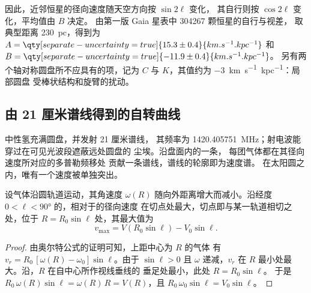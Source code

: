 因此，近邻恒星的径向速度随天空方向按 $\sin 2\ell$ 变化，
其自行则按 $\cos 2\ell$ 变化，平均值由 $B$ 决定。
由第一版 Gaia 星表中 \num{304267} 颗恒星的自行与视差，
取典型距离 \qty{230}{pc}，得到为
$A = \qty[separate-uncertainty=true]{15.3 \pm 0.4}{km.s^{-1}.kpc^{-1}}$
和 $B = \qty[separate-uncertainty=true]{-11.9 \pm 0.4}{km.s^{-1}.kpc^{-1}}$。
另有两个轴对称圆盘所不应具有的项，记为 $C$
与 $K$，其值约为 \qty{-3}{km.s^{-1}.kpc^{-1}}：局部圆盘
受棒状结构和旋臂的扰动。

\subsection*{由 21 厘米谱线得到的自转曲线}

中性氢充满圆盘，并发射 21 厘米谱线，
其频率为 \qty{1420.405751}{MHz}；射电波能穿过在可见光波段遮蔽远处圆盘的
尘埃。沿盘面内的一条，
每团气体都在其径向速度所对应的多普勒频移处
贡献一条谱线，谱线的轮廓即为速度谱。
在太阳圆之内，唯有一个速度被单独突出。

\begin{theorem}[切点法]\label{thm:b3:milky-way-galaxies:tangent}
设气体沿圆轨道运动，其角速度 $\omega(R)$
随向外距离增大而减小。沿经度
$0 < \ell < \ang{90}$ 的，相对于的径向速度
在切点处最大，切点即与某一轨道相切之处，位于
$R = R_0\sin\ell$ 处，其最大值为
\[
v_\mathrm{max} = V(R_0\sin\ell) - V_0\sin\ell .
\]
\end{theorem}

\begin{proof}
由奥尔特公式的证明可知，上距中心为 $R$ 的气体
有 $v_r = R_0\,[\omega(R) - \omega_0]\sin\ell$。由于
$\sin\ell > 0$ 且 $\omega$ 递减，$v_r$ 在 $R$
最小处最大。沿，$R$ 在自中心所作视线垂线的
垂足处最小，此处 $R = R_0\sin\ell$。
于是 $R_0\,\omega(R)\sin\ell = \omega(R)\,R = V(R)$，且
$R_0\,\omega_0\sin\ell = V_0\sin\ell$。
\end{proof}

